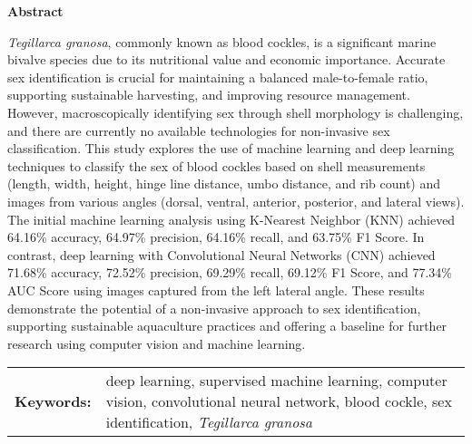 \begin{center}
	\textbf{Abstract}
\end{center}
\setlength{\parindent}{0pt}
\textit{Tegillarca granosa}, commonly known as blood cockles, is a significant marine bivalve species due to its nutritional value and economic importance. Accurate sex identification is crucial for maintaining a balanced male-to-female ratio, supporting sustainable harvesting, and improving resource management. However, macroscopically identifying sex through shell morphology is challenging, and there are currently no available technologies for non-invasive sex classification. This study explores the use of machine learning and deep learning techniques to classify the sex of blood cockles based on shell measurements (length, width, height, hinge line distance, umbo distance, and rib count) and images from various angles (dorsal, ventral, anterior, posterior, and lateral views). The initial machine learning analysis using K-Nearest Neighbor (KNN) achieved 64.16\% accuracy, 64.97\% precision, 64.16\% recall, and 63.75\% F1 Score. In contrast, deep learning with Convolutional Neural Networks (CNN) achieved 71.68\% accuracy, 72.52\% precision, 69.29\% recall, 69.12\% F1 Score, and 77.34\% AUC Score using images captured from the left lateral angle. These results demonstrate the potential of a non-invasive approach to sex identification, supporting sustainable aquaculture practices and offering a baseline for further research using computer vision and machine learning.

\begin{tabular}{lp{4.25in}}
	\hspace{-0.5em}\textbf{Keywords:}\hspace{0.25em} & deep learning, supervised machine learning, computer vision, convolutional neural network, blood cockle, sex identification, \textit{Tegillarca granosa}\\
\end{tabular}
